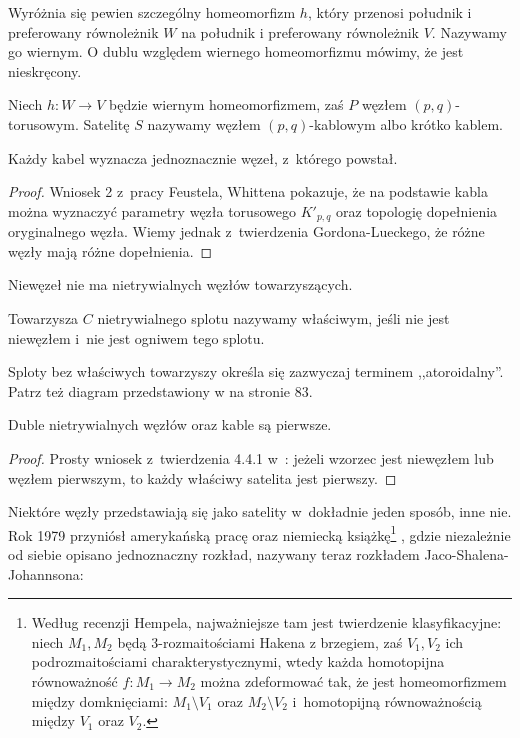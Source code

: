 Wyróżnia się pewien szczególny homeomorfizm $h$, który przenosi południk i preferowany równoleżnik $W$ na południk i preferowany równoleżnik $V$.
Nazywamy go wiernym.
O dublu względem wiernego homeomorfizmu mówimy, że jest nieskręcony.

\begin{definition}
    Niech $h \colon W \to V$ będzie wiernym homeomorfizmem, zaś $P$ węzłem $(p, q)$-torusowym.
    Satelitę $S$ nazywamy węzłem $(p, q)$-kablowym albo krótko kablem.
\end{definition}

\begin{proposition}
    Każdy kabel wyznacza jednoznacznie węzeł, z~którego powstał.
\end{proposition}

\begin{proof}
    Wniosek 2 z~pracy \cite{feustel78} Feustela, Whittena pokazuje, że na podstawie kabla można wyznaczyć parametry węzła torusowego $K'_{p,q}$ oraz topologię dopełnienia oryginalnego węzła.
    Wiemy jednak z~twierdzenia Gordona-Lueckego, że różne węzły mają różne dopełnienia.
\end{proof}

Niewęzeł nie ma nietrywialnych węzłów towarzyszących.

\begin{definition}
    Towarzysza $C$ nietrywialnego splotu nazywamy właściwym, jeśli nie jest niewęzłem i~nie jest ogniwem tego splotu.
\end{definition}

Sploty bez właściwych towarzyszy określa się zazwyczaj terminem ,,atoroidalny''.
Patrz też diagram przedstawiony w \cite{cromwell04} na stronie 83.

\begin{proposition}
    Duble nietrywialnych węzłów oraz kable są pierwsze.
\end{proposition}

\begin{proof}
    Prosty wniosek z~twierdzenia 4.4.1 w~\cite[s. 84]{cromwell04}: jeżeli wzorzec jest niewęzłem lub węzłem pierwszym, to każdy właściwy satelita jest pierwszy.
\end{proof}

Niektóre węzły przedstawiają się jako satelity w~dokładnie jeden sposób, inne nie.
Rok 1979 przyniósł amerykańską pracę \cite{jaco79} oraz niemiecką książkę\footnote{Według recenzji Hempela, najważniejsze tam jest twierdzenie klasyfikacyjne: niech $M_1, M_2$ będą 3-rozmaitościami Hakena z brzegiem, zaś $V_1, V_2$ ich podrozmaitościami charakterystycznymi, wtedy każda homotopijna równoważność $f \colon M_1 \to M_2$ można zdeformować tak, że jest homeomorfizmem między domknięciami: $M_1 \setminus V_1$ oraz $M_2 \setminus V_2$ i~homotopijną równoważnością między $V_1$ oraz $V_2$.} \cite{johannson79}, gdzie niezależnie od siebie opisano jednoznaczny rozkład, nazywany teraz rozkładem Jaco-Shalena-Johannsona:

